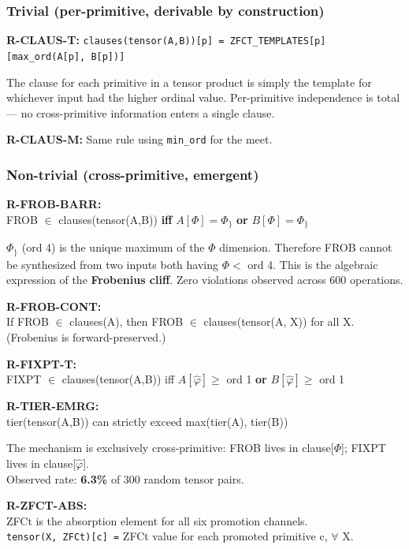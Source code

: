 \documentclass[12pt,a4paper]{article}
\begin{document}
\subsubsection*{Trivial (per-primitive, derivable by construction)}

\textbf{R-CLAUS-T:} \texttt{clauses(tensor(A,B))[p] = ZFCT\_TEMPLATES[p][max\_ord(A[p], B[p])]}

The clause for each primitive in a tensor product is simply the template for whichever input had the higher ordinal value. Per-primitive independence is total --- no cross-primitive information enters a single clause.

\textbf{R-CLAUS-M:} Same rule using \texttt{min\_ord} for the meet.

\subsubsection*{Non-trivial (cross-primitive, emergent)}

\textbf{R-FROB-BARR:} \\
FROB $\in$ clauses(tensor(A,B)) \textbf{iff} $A[\Phi] = \Phi_{\}}$ \textbf{or} $B[\Phi] = \Phi_{\}}$

$\Phi_{\}}$ (ord 4) is the unique maximum of the $\Phi$ dimension. Therefore FROB cannot be synthesized from two inputs both having $\Phi <$ ord 4. This is the algebraic expression of the \textbf{Frobenius cliff}. Zero violations observed across 600 operations.

\textbf{R-FROB-CONT:} \\
If FROB $\in$ clauses(A), then FROB $\in$ clauses(tensor(A, X)) for all X. \\
(Frobenius is forward-preserved.)

\textbf{R-FIXPT-T:} \\
FIXPT $\in$ clauses(tensor(A,B)) iff $A[\hat{\varphi}] \geq$ ord 1 \textbf{or} $B[\hat{\varphi}] \geq$ ord 1

\textbf{R-TIER-EMRG:} \\
tier(tensor(A,B)) can strictly exceed max(tier(A), tier(B))

The mechanism is exclusively cross-primitive: FROB lives in clause[$\Phi$]; FIXPT lives in clause[$\hat{\varphi}$]. \\
Observed rate: \textbf{6.3\%} of 300 random tensor pairs.

\textbf{R-ZFCT-ABS:} \\
ZFCt is the absorption element for all six promotion channels. \\
\texttt{tensor(X, ZFCt)[c] =} ZFCt value for each promoted primitive c, $\forall$ X.
\end{document}
